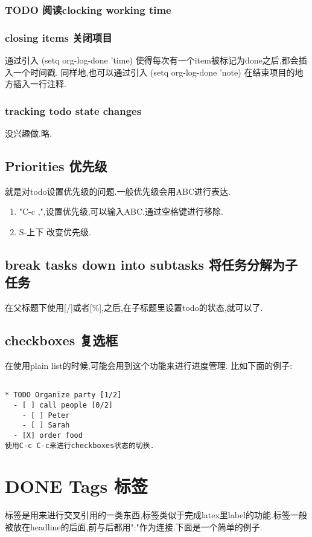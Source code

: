 \documentclass[10pt,a4paper]{article}
\begin{document}
\subsubsection{{\bfseries\sffamily TODO} 阅读clocking working time}
\label{sec:org8f71380}
\subsubsection{closing items 关闭项目}
\label{sec:org0e02f74}
通过引入
(setq org-log-done 'time)
使得每次有一个item被标记为done之后,都会插入一个时间戳.
同样地,也可以通过引入
(setq org-log-done 'note)
在结束项目的地方插入一行注释.
\subsubsection{tracking todo state changes}
\label{sec:orgd19a0d5}
没兴趣做.略.
\subsection{Priorities 优先级}
\label{sec:org64f4be3}
就是对todo设置优先级的问题.一般优先级会用ABC进行表达.
\begin{enumerate}
\item "C-c ,",设置优先级,可以输入ABC.通过空格键进行移除.
\item S-上下 改变优先级.
\end{enumerate}
\subsection{break tasks down into subtasks 将任务分解为子任务}
\label{sec:orgadda3f8}
在父标题下使用[/]或者[\%],之后,在子标题里设置todo的状态,就可以了.
\subsection{checkboxes 复选框}
\label{sec:orgb8f037e}
在使用plain list的时候,可能会用到这个功能来进行进度管理.
比如下面的例子:

\begin{verbatim}

* TODO Organize party [1/2]
  - [ ] call people [0/2]
    - [ ] Peter
    - [ ] Sarah
  - [X] order food
使用C-c C-c来进行checkboxes状态的切换.

\end{verbatim}

\section{{\bfseries\sffamily DONE} Tags 标签}
\label{sec:org10ea6f6}
标签是用来进行交叉引用的一类东西,标签类似于完成latex里label的功能.标签一般被放在headline的后面,前与后都用":"作为连接.下面是一个简单的例子.
\end{document}
